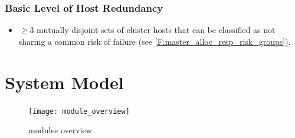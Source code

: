\documentclass[a4paper, 11pt]{article}
\let\oldsection\section
\renewcommand\section{\clearpage\oldsection}
\begin{document}
\subsubsection{Basic Level of Host Redundancy}
\begin{itemize}
	\item $\geq 3$ mutually disjoint sets of \gls{cluster} \glspl{host} that can be classified as not sharing a common risk of failure (see \ref{F:master_alloc_resp_risk_groups}).
\end{itemize}

\section{System Model}
\begin{figure}[H]
\texttt{[image: module\_overview]}
\caption{\mamid modules overview}
\end{figure}
\end{document}
